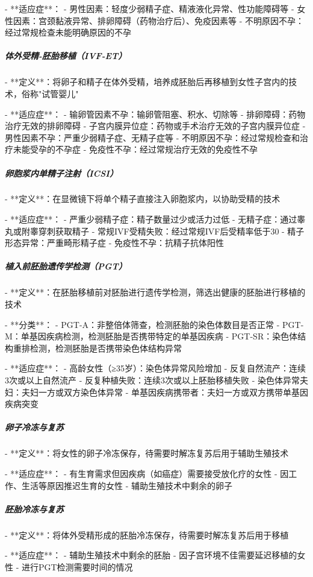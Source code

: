 \begin{enumerate}
- **适应症**：
  - 男性因素：轻度少弱精子症、精液液化异常、性功能障碍等
  - 女性因素：宫颈黏液异常、排卵障碍（药物治疗后）、免疫因素等
  - 不明原因不孕：经过常规检查未能明确原因的不孕

\subparagraph{体外受精-胚胎移植（IVF-ET）}

- **定义**：将卵子和精子在体外受精，培养成胚胎后再移植到女性子宫内的技术，俗称"试管婴儿"

- **适应症**：
  - 输卵管因素不孕：输卵管阻塞、积水、切除等
  - 排卵障碍：药物治疗无效的排卵障碍
  - 子宫内膜异位症：药物或手术治疗无效的子宫内膜异位症
  - 男性因素不孕：严重少弱精子症、无精子症等
  - 不明原因不孕：经过常规检查和治疗未能受孕的不孕症
  - 免疫性不孕：经过常规治疗无效的免疫性不孕

\subparagraph{卵胞浆内单精子注射（ICSI）}

- **定义**：在显微镜下将单个精子直接注入卵胞浆内，以协助受精的技术

- **适应症**：
  - 严重少弱精子症：精子数量过少或活力过低
  - 无精子症：通过睾丸或附睾穿刺获取精子
  - 常规IVF受精失败：经过常规IVF后受精率低于30%
  - 精子形态异常：严重畸形精子症
  - 免疫性不孕：抗精子抗体阳性

\subparagraph{植入前胚胎遗传学检测（PGT）}

- **定义**：在胚胎移植前对胚胎进行遗传学检测，筛选出健康的胚胎进行移植的技术

- **分类**：
  - PGT-A：非整倍体筛查，检测胚胎的染色体数目是否正常
  - PGT-M：单基因疾病检测，检测胚胎是否携带特定的单基因疾病
  - PGT-SR：染色体结构重排检测，检测胚胎是否携带染色体结构异常

- **适应症**：
  - 高龄女性（≥35岁）：染色体异常风险增加
  - 反复自然流产：连续3次或以上自然流产
  - 反复种植失败：连续3次或以上胚胎移植失败
  - 染色体异常夫妇：夫妇一方或双方染色体异常
  - 单基因疾病携带者：夫妇一方或双方携带单基因疾病突变

\subparagraph{卵子冷冻与复苏}

- **定义**：将女性的卵子冷冻保存，待需要时解冻复苏后用于辅助生殖技术

- **适应症**：
  - 有生育需求但因疾病（如癌症）需要接受放化疗的女性
  - 因工作、生活等原因推迟生育的女性
  - 辅助生殖技术中剩余的卵子

\subparagraph{胚胎冷冻与复苏}

- **定义**：将体外受精形成的胚胎冷冻保存，待需要时解冻复苏后用于移植

- **适应症**：
  - 辅助生殖技术中剩余的胚胎
  - 因子宫环境不佳需要延迟移植的女性
  - 进行PGT检测需要时间的情况


\end{enumerate}

